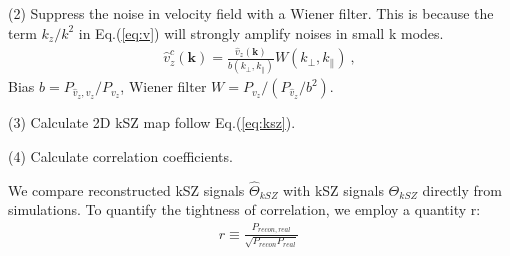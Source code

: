 (2) Suppress the noise in velocity field with a Wiener filter. 
This is because the term $k_z/k^2$ in Eq.(\ref{eq:v}) will strongly amplify noises in small k modes. 
\begin{eqnarray}
	\label{eq:wienerv}
\hat v_z^c(\bm{k})=\frac{\hat v_z(\bm{k})}{b(k_\perp,k_\parallel)}W(k_\perp,k_\parallel)\ ,
\end{eqnarray}
Bias $b=P_{\hat v_z,v_z}/P_{v_z}$, Wiener filter $W=P_{v_z}/(P_{\hat v_z}/b^2)$.

(3) Calculate 2D kSZ map follow Eq.(\ref{eq:ksz}).

(4) Calculate correlation coefficients.

We compare reconstructed kSZ signals $\hat \Theta_{kSZ}$ with kSZ signals $\Theta_{kSZ}$ directly from simulations. 
To quantify the tightness of correlation, we employ a quantity r: 
\begin{eqnarray}
	r\equiv \frac{P_{recon,real}}{\sqrt{P_{recon}P_{real}}}\,
\end{eqnarray}


